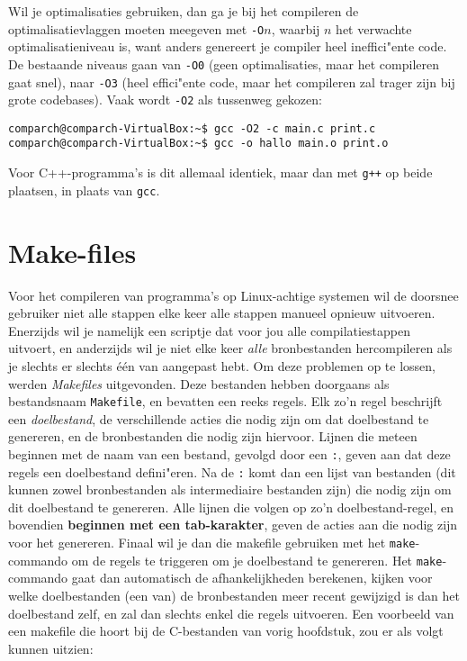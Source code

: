 \documentclass[a4paper,twoside,openany]{memoir}
\begin{document}
Wil je optimalisaties gebruiken, dan ga je bij het compileren de
optimalisatievlaggen moeten meegeven met \verb!-O!$n$, waarbij $n$ het verwachte
optimalisatieniveau is, want anders genereert je compiler heel ineffici"ente
code. De bestaande niveaus gaan van \verb!-O0! (geen optimalisaties, maar het
compileren gaat snel), naar \verb!-O3! (heel effici"ente code, maar het
compileren zal trager zijn bij grote codebases). Vaak wordt \verb!-O2! als
tussenweg gekozen:
\begin{verbatim}
comparch@comparch-VirtualBox:~$ gcc -O2 -c main.c print.c 
comparch@comparch-VirtualBox:~$ gcc -o hallo main.o print.o
\end{verbatim}

Voor C++-programma's is dit allemaal identiek, maar dan met \verb!g++! op beide
plaatsen, in plaats van \verb!gcc!.

\chapter{Make-files}

Voor het compileren van programma's op Linux-achtige systemen wil de doorsnee
gebruiker niet alle stappen elke keer alle stappen manueel opnieuw uitvoeren.
Enerzijds wil je namelijk een scriptje dat voor jou alle compilatiestappen
uitvoert, en anderzijds wil je niet elke keer \emph{alle} bronbestanden
hercompileren als je slechts er slechts één van aangepast hebt. Om deze
problemen op te lossen, werden \emph{Makefiles} uitgevonden. Deze bestanden
hebben doorgaans als bestandsnaam \verb!Makefile!, en bevatten een reeks regels.
Elk zo'n regel beschrijft een \emph{doelbestand}, de verschillende acties die
nodig zijn om dat doelbestand te genereren, en de bronbestanden die nodig zijn
hiervoor. Lijnen die meteen beginnen met de naam van een bestand, gevolgd door
een \verb!:!, geven aan dat deze regels een doelbestand defini"eren. Na de
\verb!:! komt dan een lijst van bestanden (dit kunnen zowel bronbestanden als
intermediaire bestanden zijn) die nodig zijn om dit doelbestand te genereren.
Alle lijnen die volgen op zo'n doelbestand-regel, en bovendien \textbf{beginnen
met een tab-karakter}, geven de acties aan die nodig zijn voor het genereren.
Finaal wil je dan die makefile gebruiken met het \verb!make!-commando om de
regels te triggeren om je doelbestand te genereren. Het \verb!make!-commando
gaat dan automatisch de afhankelijkheden berekenen, kijken voor welke
doelbestanden (een van) de bronbestanden meer recent gewijzigd is dan het
doelbestand zelf, en zal dan slechts enkel die regels uitvoeren. Een voorbeeld
van een makefile die hoort bij de C-bestanden van vorig hoofdstuk, zou er als
volgt kunnen uitzien:
\end{document}

